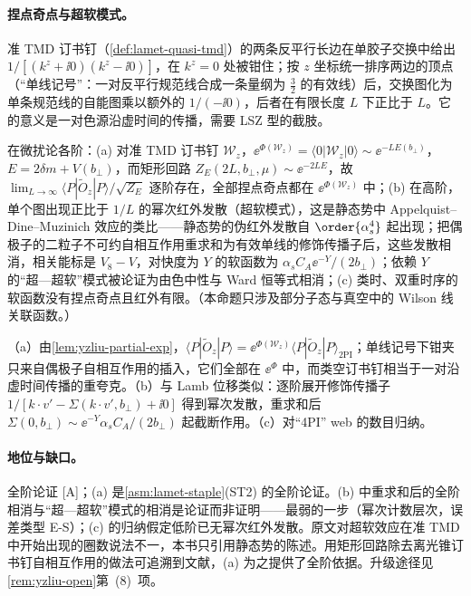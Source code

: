 \paragraph{捏点奇点与超软模式。}准 TMD 订书钉（\cref{def:lamet-quasi-tmd}）的两条反平行长边在单胶子交换中给出 $1/[(k^z+\ii0)(k^z-\ii0)]$，在 $k^z=0$ 处被钳住；按 $z$ 坐标统一排序两边的顶点（“单线记号”：一对反平行规范线合成一条量纲为 $\frac32$ 的有效线）后，交换图化为单条规范线的自能图乘以额外的 $1/(-\ii0)$，后者在有限长度 $L$ 下正比于 $L$\cite[式~(41)--(43)]{Liu:2022nnk}。它的意义是一对色源沿虚时间的传播，需要 LSZ 型的截肢。

\begin{proposition}\label{prop:yzliu-pinch-ultrasoft}
在微扰论各阶：(a) 对准 TMD 订书钉 $\mathcal W_z$，$\ee^{\Phi(\mathcal W_z)}=\langle0|\mathcal W_z|0\rangle\sim\ee^{-LE(b_\perp)}$，$E=2\delta m+V(b_\perp)$，而矩形回路 $Z_E(2L,b_\perp,\mu)\sim\ee^{-2LE}$，故 $\lim_{L\to\infty}\langle P|\tilde O_z|P\rangle/\sqrt{Z_E}$ 逐阶存在，全部捏点奇点都在 $\ee^{\Phi(\mathcal W_z)}$ 中；(b) 在高阶，单个图出现正比于 $1/L$ 的幂次红外发散（超软模式），这是静态势中 Appelquist--Dine--Muzinich 效应的类比——静态势的伪红外发散自 $\order{\alpha_s^4}$ 起出现\cite{Appelquist:1977es,Brambilla:1999qa}；把偶极子的二粒子不可约自相互作用重求和为有效单线的修饰传播子后，这些发散相消，相关能标是 $V_8-V$，对快度为 $Y$ 的软函数为 $\alpha_sC_A\ee^{-Y}/(2b_\perp)$；依赖 $Y$ 的“超—超软”模式被论证为由色中性与 Ward 恒等式相消；(c) 类时、双重时序的软函数没有捏点奇点且红外有限。（本命题只涉及部分子态与真空中的 Wilson 线关联函数。）
\end{proposition}

\begin{proofsketch}
（a）由\cref{lem:yzliu-partial-exp}，$\langle P|\tilde O_z|P\rangle=\ee^{\Phi(\mathcal W_z)}\langle P|\tilde O_z|P\rangle_{\mathrm{2PI}}$；单线记号下钳夹只来自偶极子自相互作用的插入，它们全部在 $\ee^{\Phi}$ 中，而类空订书钉相当于一对沿虚时间传播的重夸克\cite[第~3.2~节]{Liu:2022nnk}。（b）与 Lamb 位移类似：逐阶展开修饰传播子 $1/[k\cdot v'-\Sigma(k\cdot v',b_\perp)+\ii0]$ 得到幂次发散，重求和后 $\Sigma(0,b_\perp)\sim\ee^{-Y}\alpha_sC_A/(2b_\perp)$ 起截断作用\cite[第~3.3、4.3~节，式~(109)--(111)]{Liu:2022nnk}。（c）对“4PI” web 的数目归纳\cite[附录~D]{Liu:2022nnk}。
\end{proofsketch}

\paragraph{地位与缺口。}全阶论证 [A]；(a) 是\cref{asm:lamet-staple}(ST2) 的全阶论证。(b) 中重求和后的全阶相消与“超—超软”模式的相消是论证而非证明——最弱的一步（幂次计数层次，误差类型 E-S）；(c) 的归纳假定低阶已无幂次红外发散。原文对超软效应在准 TMD 中开始出现的圈数说法不一，本书只引用静态势的陈述。用矩形回路除去离光锥订书钉自相互作用的做法可追溯到文献\cite{Collins:2008ht,Ji:2018hvs}，(a) 为之提供了全阶依据。升级途径见\cref{rem:yzliu-open}第~(8)~项。


